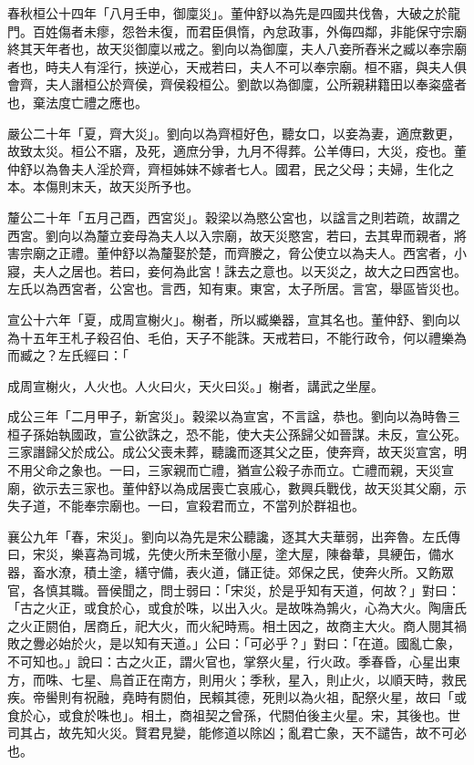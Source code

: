 \begin{pinyinscope}
春秋桓公十四年「八月壬申，御廩災」。董仲舒以為先是四國共伐魯，大破之於龍門。百姓傷者未瘳，怨咎未復，而君臣俱惰，內怠政事，外侮四鄰，非能保守宗廟終其天年者也，故天災御廩以戒之。劉向以為御廩，夫人八妾所舂米之臧以奉宗廟者也，時夫人有淫行，挾逆心，天戒若曰，夫人不可以奉宗廟。桓不寤，與夫人俱會齊，夫人譖桓公於齊侯，齊侯殺桓公。劉歆以為御廩，公所親耕籍田以奉粢盛者也，棄法度亡禮之應也。

嚴公二十年「夏，齊大災」。劉向以為齊桓好色，聽女口，以妾為妻，適庶數更，故致太災。桓公不寤，及死，適庶分爭，九月不得葬。公羊傳曰，大災，疫也。董仲舒以為魯夫人淫於齊，齊桓姊妹不嫁者七人。國君，民之父母；夫婦，生化之本。本傷則末夭，故天災所予也。

釐公二十年「五月己酉，西宮災」。穀梁以為愍公宮也，以諡言之則若疏，故謂之西宮。劉向以為釐立妾母為夫人以入宗廟，故天災愍宮，若曰，去其卑而親者，將害宗廟之正禮。董仲舒以為釐娶於楚，而齊媵之，脅公使立以為夫人。西宮者，小寢，夫人之居也。若曰，妾何為此宮！誅去之意也。以天災之，故大之曰西宮也。左氏以為西宮者，公宮也。言西，知有東。東宮，太子所居。言宮，舉區皆災也。

宣公十六年「夏，成周宣榭火」。榭者，所以臧樂器，宣其名也。董仲舒、劉向以為十五年王札子殺召伯、毛伯，天子不能誅。天戒若曰，不能行政令，何以禮樂為而臧之？左氏經曰：「

成周宣榭火，人火也。人火曰火，天火曰災。」榭者，講武之坐屋。

成公三年「二月甲子，新宮災」。穀梁以為宣宮，不言諡，恭也。劉向以為時魯三桓子孫始執國政，宣公欲誅之，恐不能，使大夫公孫歸父如晉謀。未反，宣公死。三家譖歸父於成公。成公父喪未葬，聽讒而逐其父之臣，使奔齊，故天災宣宮，明不用父命之象也。一曰，三家親而亡禮，猶宣公殺子赤而立。亡禮而親，天災宣廟，欲示去三家也。董仲舒以為成居喪亡哀戚心，數興兵戰伐，故天災其父廟，示失子道，不能奉宗廟也。一曰，宣殺君而立，不當列於群祖也。

襄公九年「春，宋災」。劉向以為先是宋公聽讒，逐其大夫華弱，出奔魯。左氏傳曰，宋災，樂喜為司城，先使火所未至徹小屋，塗大屋，陳畚輂，具綆缶，備水器，畜水潦，積土塗，繕守備，表火道，儲正徒。郊保之民，使奔火所。又飭眾官，各慎其職。晉侯聞之，問士弱曰：「宋災，於是乎知有天道，何故？」對曰：「古之火正，或食於心，或食於咮，以出入火。是故咮為鶉火，心為大火。陶唐氏之火正閼伯，居商丘，祀大火，而火紀時焉。相土因之，故商主大火。商人閱其禍敗之釁必始於火，是以知有天道。」公曰：「可必乎？」對曰：「在道。國亂亡象，不可知也。」說曰：古之火正，謂火官也，掌祭火星，行火政。季春昏，心星出東方，而咮、七星、鳥首正在南方，則用火；季秋，星入，則止火，以順天時，救民疾。帝嚳則有祝融，堯時有閼伯，民賴其德，死則以為火祖，配祭火星，故曰「或食於心，或食於咮也」。相土，商祖契之曾孫，代閼伯後主火星。宋，其後也。世司其占，故先知火災。賢君見變，能修道以除凶；亂君亡象，天不譴告，故不可必也。


\end{pinyinscope}
